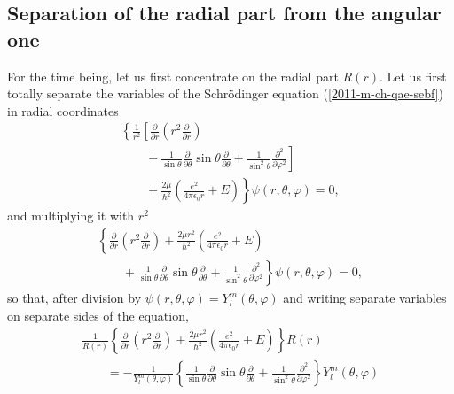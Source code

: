\subsection{Separation of the radial part from the angular one}

For the time being, let us first concentrate on
the radial part $R(r)$.
Let us first totally separate the variables of
the Schr\"odinger equation (\ref{2011-m-ch-qae-sebf})
in radial coordinates
\begin{equation}
\begin{array}{l}
\left\{ \frac{1}{r^2} \left[ \frac{\partial}{\partial r}\left( r^2\frac{\partial}{\partial r}\right)  \right.\right.  \\
\qquad
+  \left.
\frac{1}{\sin \theta}   \frac{\partial}{\partial \theta }
\sin \theta \frac{\partial}{\partial \theta }
+
\frac{1}{\sin^2 \theta} \frac{\partial^2}{\partial \varphi^2 }
\right]   \\
  \qquad +
\left.
\frac{2\mu }{\hbar^2} \left(\frac{e^2}{4\pi \epsilon_0 r} + E \right)\right\}
\psi (r, \theta ,\varphi  )=0,
\end{array}
\label{2011-m-ch-qa1e}
\end{equation}
and multiplying it with $r^2$
\begin{equation}
\begin{array}{l}
\left\{  \frac{\partial}{\partial r}\left( r^2\frac{\partial}{\partial r}\right) +
\frac{2\mu r^2}{\hbar^2} \left(\frac{e^2}{4\pi \epsilon_0 r} + E \right) \right.  \\
\qquad
+  \left.
\frac{1}{\sin \theta}   \frac{\partial}{\partial \theta }
\sin \theta \frac{\partial}{\partial \theta }
+
\frac{1}{\sin^2 \theta} \frac{\partial^2}{\partial \varphi^2 }
\right\}
\psi (r, \theta ,\varphi  )=0
,
\end{array}
\label{2011-m-ch-qae2}
\end{equation}
so that, after division by $\psi (r, \theta ,\varphi  )=Y_l^m ( \theta ,\varphi )$
and writing separate variables on separate sides of the equation,
\begin{equation}
\begin{array}{l}
\frac{1}{R( r )}
\left\{  \frac{\partial}{\partial r}\left( r^2\frac{\partial}{\partial r}\right) +
\frac{2\mu r^2}{\hbar^2} \left(\frac{e^2}{4\pi \epsilon_0 r} + E \right) \right\} R(r)
\\ \qquad =
-\frac{1}{Y_l^m ( \theta ,\varphi )} \left\{
\frac{1}{\sin \theta}   \frac{\partial}{\partial \theta }
\sin \theta \frac{\partial}{\partial \theta }
+
\frac{1}{\sin^2 \theta} \frac{\partial^2}{\partial \varphi^2 }
\right\}
Y_l^m ( \theta ,\varphi )
\end{array}
\label{2011-m-ch-qae3}
\end{equation}
